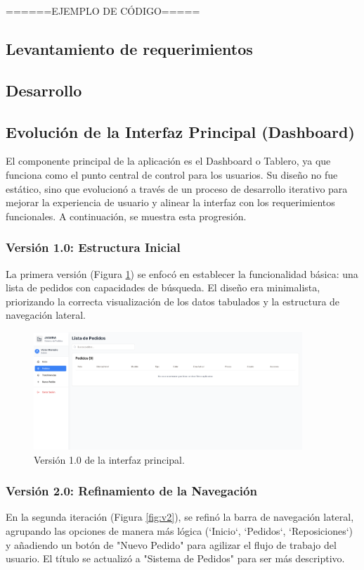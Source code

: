 \documentclass[12pt,letterpaper,spanish]{report}
\begin{document}
======EJEMPLO DE CÓDIGO=====


\subsection{Levantamiento de requerimientos}

\subsection{Desarrollo}

\subsection{Evolución de la Interfaz Principal (Dashboard)}
\label{sec:evolucion_dashboard}

El componente principal de la aplicación es el Dashboard o Tablero, ya que funciona como el punto central de control para los usuarios. Su diseño no fue estático, sino que evolucionó a través de un proceso de desarrollo iterativo para mejorar la experiencia de usuario y alinear la interfaz con los requerimientos funcionales. A continuación, se muestra esta progresión.

\subsubsection{Versión 1.0: Estructura Inicial}
La primera versión (Figura \ref{fig:v1}) se enfocó en establecer la funcionalidad básica: una lista de pedidos con capacidades de búsqueda. El diseño era minimalista, priorizando la correcta visualización de los datos tabulados y la estructura de navegación lateral.

\begin{figure}[H]
    \centering
    \includegraphics[width=0.9\textwidth]{V1.0.png}
    \caption{Versión 1.0 de la interfaz principal.}
    \label{fig:v1}
\end{figure}

\subsubsection{Versión 2.0: Refinamiento de la Navegación}
En la segunda iteración (Figura \ref{fig:v2}), se refinó la barra de navegación lateral, agrupando las opciones de manera más lógica (`Inicio`, `Pedidos`, `Reposiciones`) y añadiendo un botón de "Nuevo Pedido" para agilizar el flujo de trabajo del usuario. El título se actualizó a "Sistema de Pedidos" para ser más descriptivo.
\end{document}
